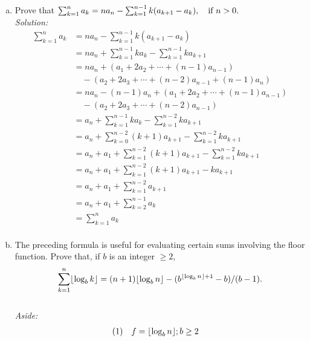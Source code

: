 \documentclass[fontsize=11pt, paper=a4]{scrartcl}
\DeclarePairedDelimiter\floor{\lfloor}{\rfloor}
\begin{document}
\begin{enumerate}[(a), leftmargin=1.5cm]
    \item Prove that $\sum_{k=1}^n a_{k} = na_{n} - \sum_{k=1}^{n-1} k(a_{k+1}-a_{k}), \quad \text{if\space} n > 0.$
        \enlargethispage{0.5cm}
        \vspace{0.5cm}
        \\\textit{Solution:}
        \begin{align*}
            \sum_{k=1}^{n} a_{k}
            &= na_{n} - \sum_{k=1}^{n-1} k(a_{k+1}-a_{k})\\
            &= na_{n} + \sum_{k=1}^{n-1} ka_{k} - \sum_{k=1}^{n-1}ka_{k+1}\\
            &= na_{n} + (a_{1} + 2a_{2} + \cdots + (n-1)a_{n-1})\\
            &\quad - (a_{2} + 2a_{3} + \cdots + (n-2)a_{n-1} + (n-1)a_{n})\\
            &= na_{n} - (n-1)a_{n} + (a_{1} + 2a_{2} + \cdots + (n-1)a_{n-1})\\
            &\quad - (a_{2} + 2a_{3} + \cdots + (n-2)a_{n-1})\\
            &= a_{n} + \sum_{k=1}^{n-1} ka_{k} - \sum_{k=1}^{n-2}ka_{k+1}\\
            &= a_{n} + \sum_{k=0}^{n-2} (k+1)a_{k+1} - \sum_{k=1}^{n-2}ka_{k+1}\\
            &= a_{n} + a_{1} + \sum_{k=1}^{n-2} (k+1)a_{k+1} - \sum_{k=1}^{n-2}ka_{k+1}\\
            &= a_{n} + a_{1} + \sum_{k=1}^{n-2} (k+1)a_{k+1} - ka_{k+1}\\
            &= a_{n} + a_{1} + \sum_{k=1}^{n-2} a_{k+1}\\
            &= a_{n} + a_{1} + \sum_{k=2}^{n-1} a_{k}\\
            &= \sum_{k=1}^{n} a_{k}\\
        \end{align*}
    \item The preceding formula is useful for evaluating certain sums involving the floor function. Prove that, if $b$ is an integer $\ge 2$,
        \begin{equation*}
            \sum_{k=1}^{n} \floor*{\log_b{k}} = (n+1) \floor*{\log_b{n}} - (b^{\floor*{\log_b{n}} + 1} - b) / (b-1).
        \end{equation*}
        \vspace{0.5em}
        \\\textit{Aside:}
        \begin{align*}
            (1) \quad f  &= \floor*{\log_b{n}}; b \ge 2

\end{align*}
\end{enumerate}
\end{document}
